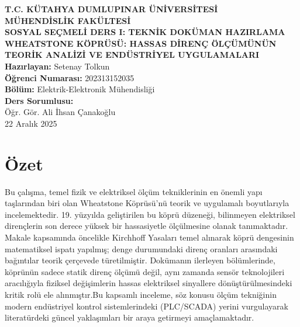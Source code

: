 \documentclass[12pt,a4paper]{article}
\begin{document}
\thispagestyle{empty}
\begin{center}
    \vspace*{1cm}
    \textbf{\large T.C. KÜTAHYA DUMLUPINAR ÜNİVERSİTESİ} \\
    \textbf{\large MÜHENDİSLİK FAKÜLTESİ} \\
    \vspace{1.5cm}
    \textbf{SOSYAL SEÇMELİ DERS I: TEKNİK DOKÜMAN HAZIRLAMA} \\
    \vspace{2.5cm}
    \huge \textbf{WHEATSTONE KÖPRÜSÜ: HASSAS DİRENÇ ÖLÇÜMÜNÜN TEORİK ANALİZİ VE ENDÜSTRİYEL UYGULAMALARI} \\
    \vspace{2.5cm}
    \large
    \textbf{Hazırlayan:} Setenay Tolkun \\
    \textbf{Öğrenci Numarası:} 202313152035 \\
    \textbf{Bölüm:} Elektrik-Elektronik Mühendisliği \\
    \vspace{1.5cm}
    \textbf{Ders Sorumlusu:} \\
    Öğr. Gör. Ali İhsan Çanakoğlu \\
    \vfill
    \large 22 Aralık 2025
\end{center}

\newpage
{}

\section*{Özet}
Bu çalışma, temel fizik ve elektriksel ölçüm tekniklerinin en önemli yapı taşlarından biri olan Wheatstone Köprüsü'nü teorik ve uygulamalı boyutlarıyla incelemektedir. 19. yüzyılda geliştirilen bu köprü düzeneği, bilinmeyen elektriksel dirençlerin son derece yüksek bir hassasiyetle ölçülmesine olanak tanımaktadır. Makale kapsamında öncelikle Kirchhoff Yasaları temel alınarak köprü dengesinin matematiksel ispatı yapılmış; denge durumundaki direnç oranları arasındaki bağıntılar teorik çerçevede türetilmiştir. Dokümanın ilerleyen bölümlerinde, köprünün sadece statik direnç ölçümü değil, aynı zamanda sensör teknolojileri aracılığıyla fiziksel değişimlerin hassas elektriksel sinyallere dönüştürülmesindeki kritik rolü ele alınmıştır.Bu kapsamlı inceleme, söz konusu ölçüm tekniğinin modern endüstriyel kontrol sistemlerindeki (PLC/SCADA) yerini vurgulayarak literatürdeki güncel yaklaşımları bir araya getirmeyi amaçlamaktadır.
\end{document}
